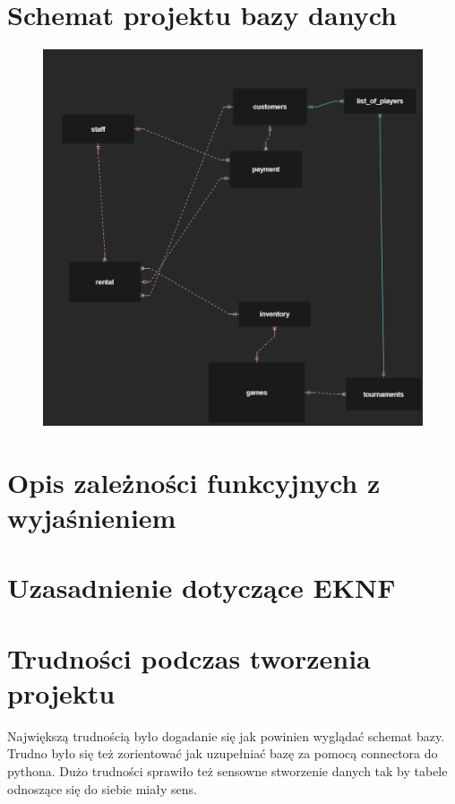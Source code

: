 \documentclass[12pt,a4paper]{article}
\begin{document}
\section{Schemat projektu bazy danych}
\begin{figure}[H]
\centering
\includegraphics[width=150mm]{schemat.png}
\end{figure}

\section{Opis zależności funkcyjnych z wyjaśnieniem}



\section{Uzasadnienie dotyczące EKNF}

\section{Trudności podczas tworzenia projektu}
Największą trudnością było dogadanie się jak powinien wyglądać schemat bazy. Trudno było się też zorientować jak
uzupełniać bazę za pomocą connectora do pythona. Dużo trudności sprawiło też sensowne stworzenie danych tak by tabele
odnoszące się do siebie miały sens.
\end{document}
